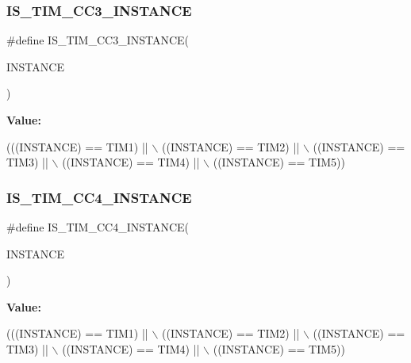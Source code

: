 \subsubsection{\texorpdfstring{I\+S\+\_\+\+T\+I\+M\+\_\+\+C\+C3\+\_\+\+I\+N\+S\+T\+A\+N\+CE}{IS\_TIM\_CC3\_INSTANCE}}
{\footnotesize\ttfamily \#define I\+S\+\_\+\+T\+I\+M\+\_\+\+C\+C3\+\_\+\+I\+N\+S\+T\+A\+N\+CE(\begin{DoxyParamCaption}\item[{}]{I\+N\+S\+T\+A\+N\+CE }\end{DoxyParamCaption})}

{\bfseries Value\+:}
\begin{DoxyCode}
(((INSTANCE) == TIM1) || \(\backslash\)
                                         ((INSTANCE) == TIM2) || \(\backslash\)
                                         ((INSTANCE) == TIM3) || \(\backslash\)
                                         ((INSTANCE) == TIM4) || \(\backslash\)
                                         ((INSTANCE) == TIM5))
\end{DoxyCode}
\mbox{\label{group___exported__macros_gae72b7182a73d81c33196265b31091c07}} 
\subsubsection{\texorpdfstring{I\+S\+\_\+\+T\+I\+M\+\_\+\+C\+C4\+\_\+\+I\+N\+S\+T\+A\+N\+CE}{IS\_TIM\_CC4\_INSTANCE}}
{\footnotesize\ttfamily \#define I\+S\+\_\+\+T\+I\+M\+\_\+\+C\+C4\+\_\+\+I\+N\+S\+T\+A\+N\+CE(\begin{DoxyParamCaption}\item[{}]{I\+N\+S\+T\+A\+N\+CE }\end{DoxyParamCaption})}

{\bfseries Value\+:}
\begin{DoxyCode}
(((INSTANCE) == TIM1) || \(\backslash\)
                                       ((INSTANCE) == TIM2) || \(\backslash\)
                                       ((INSTANCE) == TIM3) || \(\backslash\)
                                       ((INSTANCE) == TIM4) || \(\backslash\)
                                       ((INSTANCE) == TIM5))
\end{DoxyCode}
\mbox{\label{group___exported__macros_ga8111ef18a809cd882ef327399fdbfc8f}} 
